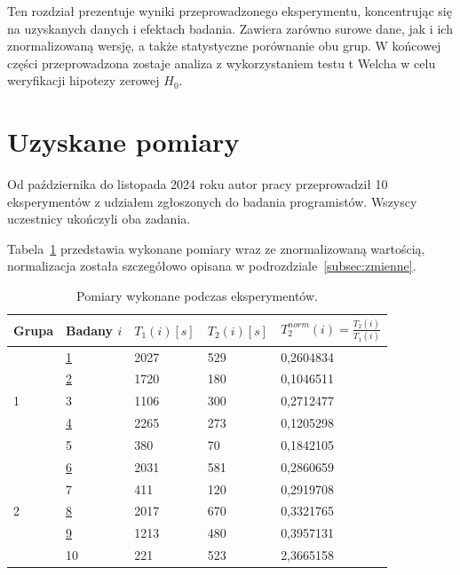 Ten rozdział prezentuje wyniki przeprowadzonego eksperymentu, koncentrując się na uzyskanych danych i efektach badania.
Zawiera zarówno surowe dane, jak i ich znormalizowaną wersję, a także statystyczne porównanie obu grup.
W końcowej części przeprowadzona zostaje analiza z wykorzystaniem testu t Welcha w celu weryfikacji hipotezy zerowej
\(H_{0}\).


\section{Uzyskane pomiary}

Od października do listopada 2024 roku autor pracy przeprowadził 10 eksperymentów z udziałem zgłoszonych do badania
programistów.
Wszyscy uczestnicy ukończyli oba zadania.

Tabela~\ref{tab:czas_norm} przedstawia wykonane pomiary wraz ze znormalizowaną wartością, normalizacja została
szczegółowo opisana w podrozdziale~\ref{subsec:zmienne}.

\begin{table}[h]
    \centering
    \begin{tabular}{l|l|l|l|l}
        Grupa & Badany \(i\) & \(T_{1}(i) [s]\) & \(T_{2}(i) [s]\) &
        \(T_2^{norm}(i) = \frac{T_{2}(i)}{T_{1}(i)}\) \\\hline\hline
        \multirow{5}{*}{1} & \underline{1} & 2027 & 529 & 0,2604834 \\
        & \underline{2} & 1720 & 180 & 0,1046511 \\
        & 3             & 1106 & 300 & 0,2712477 \\
        & \underline{4} & 2265 & 273 & 0,1205298 \\
        & 5             & 380  & 70  & 0,1842105 \\ \hline
        \multirow{5}{*}{2} & \underline{6} & 2031 & 581 & 0,2860659 \\
        & 7             & 411  & 120 & 0,2919708 \\
        & \underline{8} & 2017 & 670 & 0,3321765 \\
        & \underline{9} & 1213 & 480 & 0,3957131 \\
        & 10            & 221  & 523 & 2,3665158 \\ \hline
    \end{tabular}
    \caption{\label{tab:czas_norm}Pomiary wykonane podczas eksperymentów.}
\end{table}


